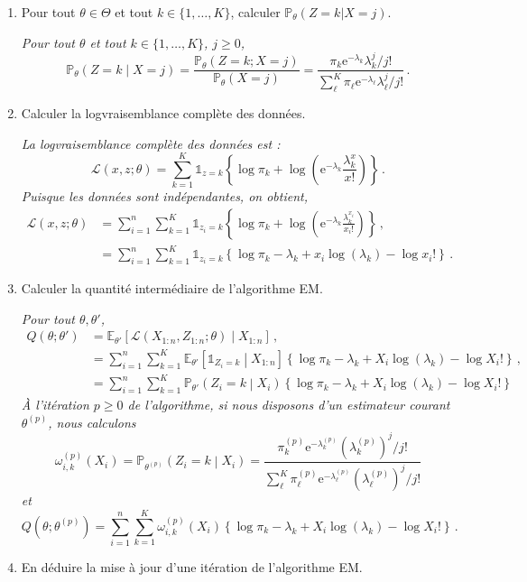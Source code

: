 \documentclass[a4paper,10pt,fleqn]{article}
\newcommand{\1}{\ensuremath{\mathbbm{1}}}
\begin{document}
\begin{enumerate}
\begin{enumerate}
\item Pour tout $\theta\in\Theta$ et tout $k\in\{1,\ldots,K\}$, calculer $\mathbb{P}_\theta(Z=k|X=j)$.

\vspace{.2cm}

{\em
Pour tout $\theta$ et tout $k\in\{1,\ldots,K\}$, $j\geq 0$,
$$
\mathbb{P}_\theta\left(Z=k\middle|X=j\right) = \frac{\mathbb{P}_\theta\left(Z=k;X=j\right)}{\mathbb{P}_\theta\left(X=j\right)} = \frac{\pi_k \mathrm{e}^{-\lambda_k}\lambda_k^{j}/j!}{\sum_{\ell}^K\pi_\ell \mathrm{e}^{-\lambda_\ell}\lambda_\ell^{j}/j!}\,.
$$}
\item Calculer la logvraisemblance compl\`ete des donn\'ees.

\vspace{.2cm}

{\em La logvraisemblance compl\`ete des donn\'ees est :
$$
\mathcal{L}(x,z;\theta) = \sum_{k=1}^K \mathds{1}_{z=k}\left\{\log \pi_k + \log \left(\mathrm{e}^{-\lambda_k}\frac{\lambda_k^{x}}{x!}\right)\right\}\,.
$$
Puisque les donn\'ees sont ind\'ependantes, on obtient,
\begin{align*}
\mathcal{L}(x,z;\theta) &= \sum_{i=1}^n\sum_{k=1}^K \mathds{1}_{z_i=k}\left\{\log \pi_k + \log \left(\mathrm{e}^{-\lambda_k}\frac{\lambda_k^{x_i}}{x_i!}\right)\right\}\,,\\
&=\sum_{i=1}^n\sum_{k=1}^K \mathds{1}_{z_i=k}\left\{\log \pi_k - \lambda_k+ x_i\log \left(\lambda_k\right) - \log x_i!\right\}\,.
\end{align*}}
\item  Calculer la quantit\'e interm\'ediaire de l'algorithme EM.

\vspace{.2cm}

{\em Pour tout $\theta, \theta'$,
\begin{align*}
Q(\theta;\theta') &= \mathbb{E}_{\theta'}\left[\mathcal{L}(X_{1:n},Z_{1:n};\theta)\middle|X_{1:n}\right] \,,\\
&= \sum_{i=1}^n\sum_{k=1}^K \mathbb{E}_{\theta'}\left[\mathds{1}_{Z_i=k}\middle|X_{1:n}\right]\left\{\log \pi_k - \lambda_k+ X_i\log \left(\lambda_k\right) - \log X_i!\right\}\,,\\
&= \sum_{i=1}^n\sum_{k=1}^K \mathbb{P}_{\theta'}\left(Z_i=k\middle|X_{i}\right)\left\{\log \pi_k - \lambda_k+ X_i\log \left(\lambda_k\right) - \log X_i!\right\}
\end{align*}
\`A l'it\'eration $p\geq 0$ de l'algorithme, si nous disposons d'un estimateur courant $\theta^{(p)}$, nous calculons
$$
\omega_{i,k}^{(p)}(X_i) = \mathbb{P}_{\theta^{(p)}}\left(Z_i=k\middle|X_{i}\right) = \frac{\pi^{(p)}_k \mathrm{e}^{-\lambda^{(p)}_k}(\lambda^{(p)}_k)^{j}/j!}{\sum_{\ell}^K\pi^{(p)}_\ell \mathrm{e}^{-\lambda^{(p)}_\ell}(\lambda^{(p)}_\ell)^{j}/j!}
$$
et 
$$
Q(\theta;\theta^{(p)}) = \sum_{i=1}^n\sum_{k=1}^K \omega_{i,k}^{(p)}(X_i) \left\{\log \pi_k - \lambda_k+ X_i\log \left(\lambda_k\right) - \log X_i!\right\}\,.
$$}
\item En d\'eduire la mise \`a jour d'une it\'eration de l'algorithme EM.


\end{enumerate}
\end{enumerate}
\end{document}
